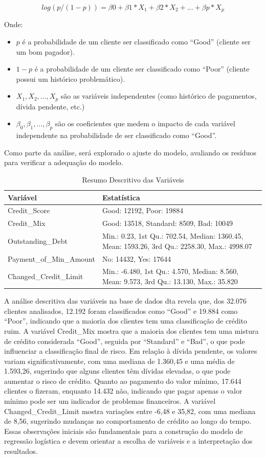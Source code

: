 \documentclass[
  letterpaper,
  DIV=11,
  numbers=noendperiod]{scrreprt}
\begin{document}
\[log(p / (1 - p)) = β0 + β1 * X_1 + β2 * X_2 + ... + βp * X_p\]

Onde:

\begin{itemize}
\item
  \(p\) é a probabilidade de um cliente ser classificado como ``Good''
  (cliente ser um bom pagador).
\item
  \(1-p\) é a probabilidade de um cliente ser classificado como ``Poor''
  (cliente possui um histórico problemático).
\item
  \(X_1, X_2, ..., X_p\) são as variáveis independentes (como histórico
  de pagamentos, dívida pendente, etc.)
\item
  \(\beta_0, \beta_1, ..., \beta_p\) são os coeficientes que medem o
  impacto de cada variável independente na probabilidade de ser
  classificado como ``Good''.
\end{itemize}

Como parte da análise, será explorado o ajuste do modelo, avaliando os
resíduos para verificar a adequação do modelo.

\begin{longtable}[t]{l>{\raggedright\arraybackslash}p{17em}}
\caption{\label{tab:unnamed-chunk-32}Resumo Descritivo das Variáveis}\\
\toprule
Variável & Estatística\\
\midrule
Credit\_Score & Good: 12192, Poor: 19884\\
Credit\_Mix & Good: 13518, Standard: 8509, Bad: 10049\\
Outstanding\_Debt & Min.: 0.23, 1st Qu.: 702.54, Median: 1360.45, Mean: 1593.26, 3rd Qu.: 2258.30, Max.: 4998.07\\
Payment\_of\_Min\_Amount & No: 14432, Yes: 17644\\
Changed\_Credit\_Limit & Min.: -6.480, 1st Qu.: 4.570, Median: 8.560, Mean: 9.573, 3rd Qu.: 13.130, Max.: 35.820\\
\bottomrule
\end{longtable}

A análise descritiva das variáveis na base de dados dta revela que, dos
32.076 clientes analisados, 12.192 foram classificados como ``Good'' e
19.884 como ``Poor'', indicando que a maioria dos clientes tem uma
classificação de crédito ruim. A variável Credit\_Mix mostra que a
maioria dos clientes tem uma mistura de crédito considerada ``Good'',
seguida por ``Standard'' e ``Bad'', o que pode influenciar a
classificação final de risco. Em relação à dívida pendente, os valores
variam significativamente, com uma mediana de 1.360,45 e uma média de
1.593,26, sugerindo que alguns clientes têm dívidas elevadas, o que pode
aumentar o risco de crédito. Quanto ao pagamento do valor mínimo, 17.644
clientes o fizeram, enquanto 14.432 não, indicando que pagar apenas o
valor mínimo pode ser um indicador de problemas financeiros. A variável
Changed\_Credit\_Limit mostra variações entre -6,48 e 35,82, com uma
mediana de 8,56, sugerindo mudanças no comportamento de crédito ao longo
do tempo. Essas observações iniciais são fundamentais para a construção
do modelo de regressão logística e devem orientar a escolha de variáveis
e a interpretação dos resultados.
\end{document}
